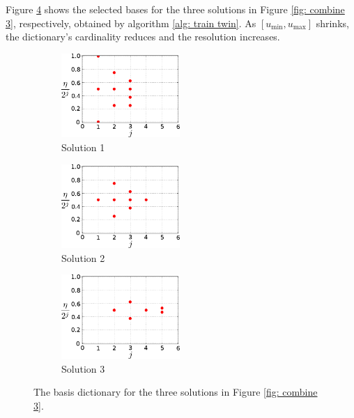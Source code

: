 Figure \ref{fig: basis pnt} shows the selected bases
for the three solutions in Figure \ref{fig: combine 3}, respectively, obtained by 
algorithm \ref{alg: train twin}.
As $\left[u_{\min}, u_{\max}\right]$ shrinks, the dictionary's cardinality reduces and
the resolution increases. \\

\begin{figure}[htbp]\begin{center}
    \begin{subfigure}[t]{.32\textwidth}
        \centering
        \includegraphics[width=4.5cm]{../basis_pnt_1.png}
        \caption{Solution 1}
        \label{fig: basis pnt 1}
    \end{subfigure}
    \begin{subfigure}[t]{.32\textwidth}     
        \centering
        \includegraphics[width=4.5cm]{../basis_pnt_2.png}
        \caption{Solution 2}
        \label{fig: basis pnt 2}
    \end{subfigure}
    \begin{subfigure}[t]{.32\textwidth}
        \centering
        \includegraphics[width=4.5cm]{../basis_pnt_3.png}
        \caption{Solution 3}
        \label{fig: basis pnt 3}
    \end{subfigure}
    \caption{The basis dictionary for the three solutions in Figure \ref{fig: combine 3}.}
    \label{fig: basis pnt}
\end{center}\end{figure}

